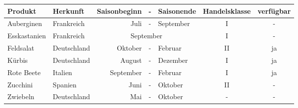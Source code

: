 \documentclass{article}
\begin{document}
\begin{tabular}{l l r c l c c}
Produkt & Herkunft & Saisonbeginn&-& Saisonende &Handelsklasse &verfügbar \\ \midrule[1pt]
Auberginen&Frankreich &Juli&-&September&I& - \\
Esskastanien&Frankreich&\multicolumn{3}{c}{September}&I&-\\
Feldsalat&Deutschland&Oktober&-&Februar&II&ja\\
Kürbis&Deutschland&August&-&Dezember&I&ja\\
Rote Beete&Italien&September&-&Februar&I&ja\\
Zucchini&Spanien&Juni&-&Oktober&II&-\\
Zwiebeln&Deutschland&Mai&-&Oktober&-&-
\end{tabular}
\end{document}
